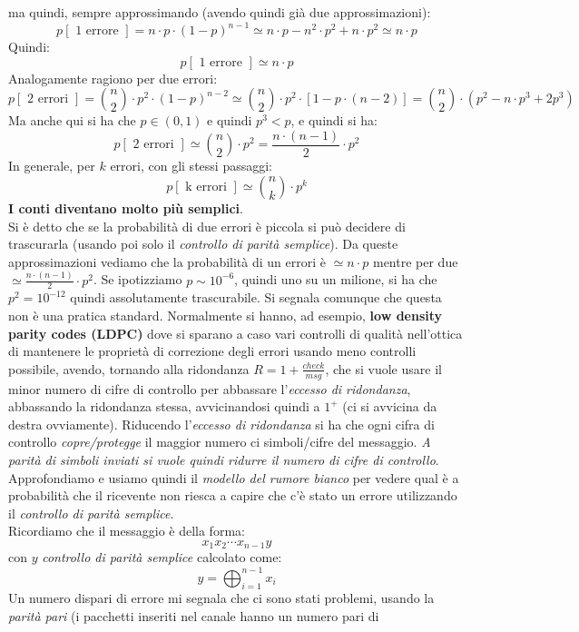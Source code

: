\documentclass[a4paper,12pt, oneside]{book}
\begin{document}
ma quindi, sempre approssimando (avendo quindi già due approssimazioni):
\[p[\mbox{ 1 errore }]=n\cdot p\cdot(1-p)^{n-1}\simeq n\cdot p-n^2\cdot
  p^2+n\cdot p^2\simeq n\cdot p\]
Quindi:
\[p[\mbox{ 1 errore }]\simeq n\cdot p\]
Analogamente ragiono per due errori:
\[p[\mbox{ 2 errori }]={{n}\choose{2}}\cdot
  p^2\cdot(1-p)^{n-2}\simeq{{n}\choose{2}}\cdot
  p^2\cdot[1-p\cdot(n-2)]={{n}\choose{2}}\cdot (p^2-n\cdot p^3+2p^3)\]
Ma anche qui si ha che $p\in(0,1)$ e quindi $p^3<p$, e quindi si ha:
\[p[\mbox{ 2 errori }]\simeq{{n}\choose{2}}\cdot p^2=\frac{n\cdot
    (n-1)}{2}\cdot p^2\]
In generale, per $k$ errori, con gli stessi passaggi:
\[p[\mbox{ k errori }]\simeq{{n}\choose{k}}\cdot p^k\]
\textbf{I conti diventano molto più semplici}.\\
Si è detto che se la probabilità di due errori è piccola si può decidere di
trascurarla (usando poi solo il \textit{controllo di parità semplice}). Da
queste approssimazioni vediamo che la probabilità di un errori è $\simeq n\cdot
p$ mentre per due $\simeq\frac{n\cdot (n-1)}{2}\cdot p^2$. Se ipotizziamo $p\sim
10^{-6}$, quindi uno su un milione, si ha che $p^2=10^{-12}$ quindi assolutamente
trascurabile. Si segnala comunque che questa non è una pratica standard.
Normalmente si hanno, ad esempio, \textbf{low density parity codes (LDPC)} dove
si sparano a caso vari controlli di qualità nell'ottica di mantenere le
proprietà di correzione degli errori usando meno controlli possibile, avendo,
tornando alla ridondanza $R=1+\frac{check}{msg}$, che si vuole usare il minor
numero di cifre di controllo per abbassare l'\textit{eccesso di ridondanza},
abbassando la ridondanza stessa, avvicinandosi quindi a $1^+$ (ci si avvicina
da destra ovviamente). Riducendo l'\textit{eccesso di ridondanza} si ha che
ogni cifra di controllo \textit{copre/protegge} il maggior numero ci
simboli/cifre del messaggio. \textit{A parità di simboli inviati si vuole quindi
  ridurre il numero di cifre di controllo}.\\
Approfondiamo e usiamo quindi il\textit{ modello del rumore bianco} per vedere
qual è a probabilità che il ricevente non riesca a capire che c'è stato un
errore utilizzando il \textit{controllo di parità semplice}.\\
Ricordiamo che il messaggio è della forma:
\[x_1x_2\cdots x_{n-1}y\]
con $y$ \textit{controllo di parità semplice} calcolato come:
\[y=\bigoplus_{i=1}^{n-1}x_i\]
Un numero dispari di errore mi segnala che ci sono stati problemi, usando la
\textit{parità pari} (i pacchetti inseriti nel canale hanno un numero pari di
\end{document}
